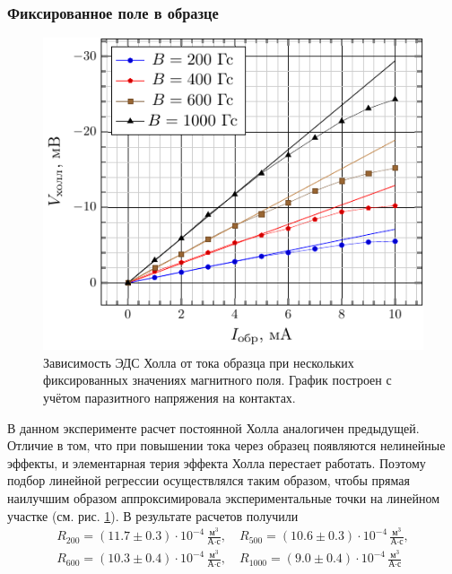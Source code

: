 \documentclass[a4paper,14pt]{extarticle}
\def\Rdim{\,\frac{\text{м}^3}{\text{А} \cdot \text{с}}}
\begin{document}
\subsubsection{Фиксированное поле в образце}
\begin{figure}[H]
	\centering
	\includegraphics[scale=1.2]{plot/current-hall_voltage-without_excess.pdf}
	\caption{Зависимость ЭДС Холла от тока образца при нескольких фиксированных значениях магнитного поля. График построен с учётом паразитного напряжения на контактах.}
	\label{fig:5.6}
\end{figure}

В данном эксперименте расчет постоянной Холла аналогичен предыдущей. Отличие в том, что при повышении тока через образец появляются нелинейные эффекты, и элементарная терия эффекта Холла перестает работать. Поэтому подбор линейной регрессии осуществлялся таким образом, чтобы прямая наилучшим образом аппроксимировала экспериментальные точки на линейном участке (см. рис. \ref{fig:5.6}). В результате расчетов получили
\begin{gather}
	R_{200}= (11.7\pm0.3)\cdot10^{-4} \Rdim, 	\quad
R_{500}= (10.6\pm0.3)\cdot10^{-4} \Rdim,\\
R_{600}= (10.3\pm0.4)\cdot10^{-4} \Rdim, 	\quad
R_{1000}= (9.0\pm0.4)\cdot10^{-4} \Rdim
\end{gather}
\end{document}
